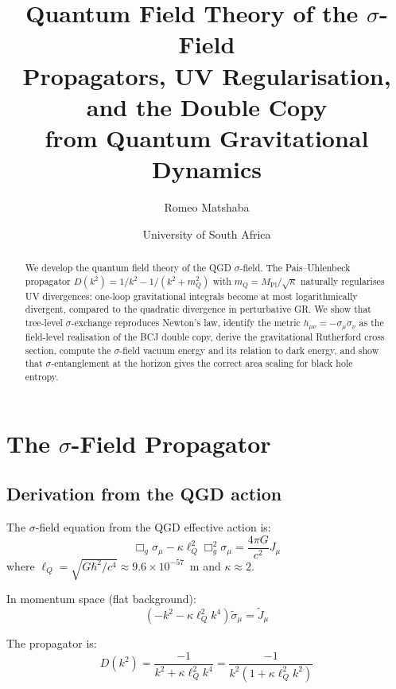 \documentclass[11pt,a4paper]{article}
\title{\textbf{Quantum Field Theory of the $\sigma$-Field}\\[4pt]
\Large Propagators, UV Regularisation, and the Double Copy\\[4pt]
\normalsize from Quantum Gravitational Dynamics}
\author{Romeo Matshaba}
\date{University of South Africa}
\theoremstyle{plain}
\theoremstyle{definition}
\theoremstyle{remark}
\newcommand{\lQ}{\ell_Q}
\newcommand{\mQ}{m_Q}
\newcommand{\Mpl}{M_{\mathrm{Pl}}}
\begin{document}
\maketitle

\begin{abstract}
We develop the quantum field theory of the QGD $\sigma$-field.  The Pais--Uhlenbeck propagator $D(k^2) = 1/k^2 - 1/(k^2 + \mQ^2)$ with $\mQ = \Mpl/\sqrt{\kappa}$ naturally regularises UV divergences: one-loop gravitational integrals become at most logarithmically divergent, compared to the quadratic divergence in perturbative GR.  We show that tree-level $\sigma$-exchange reproduces Newton's law, identify the metric $h_{\mu\nu} = -\sigma_\mu\sigma_\nu$ as the field-level realisation of the BCJ double copy, derive the gravitational Rutherford cross section, compute the $\sigma$-field vacuum energy and its relation to dark energy, and show that $\sigma$-entanglement at the horizon gives the correct area scaling for black hole entropy.
\end{abstract}

\tableofcontents

\section{The $\sigma$-Field Propagator}
\label{sec:propagator}

\subsection{Derivation from the QGD action}

The $\sigma$-field equation from the QGD effective action is:
\begin{equation}
  \Box_g\sigma_\mu - \kappa\lQ^2\Box_g^2\sigma_\mu = \frac{4\pi G}{c^2}J_\mu
  \label{eq:sigma_feq}
\end{equation}
where $\lQ = \sqrt{G\hbar^2/c^4} \approx 9.6\times10^{-57}$~m and $\kappa \approx 2$.

In momentum space (flat background):
\begin{equation}
  (-k^2 - \kappa\lQ^2 k^4)\tilde\sigma_\mu = \tilde J_\mu
\end{equation}

The propagator is:
\begin{equation}
  D(k^2) = \frac{-1}{k^2 + \kappa\lQ^2 k^4} = \frac{-1}{k^2(1 + \kappa\lQ^2 k^2)}
  \label{eq:propagator_raw}
\end{equation}
\end{document}

